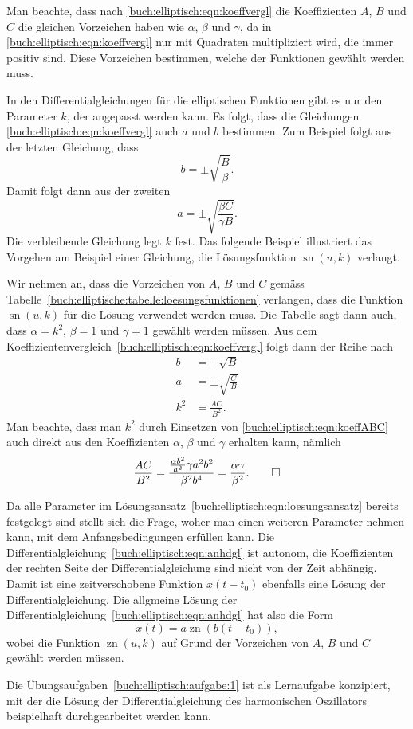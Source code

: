 Man beachte, dass nach \eqref{buch:elliptisch:eqn:koeffvergl} die 
Koeffizienten $A$, $B$ und $C$ die gleichen Vorzeichen haben wie
$\alpha$, $\beta$ und $\gamma$, da in 
\eqref{buch:elliptisch:eqn:koeffvergl} nur mit Quadraten multipliziert
wird, die immer positiv sind.
Diese Vorzeichen bestimmen, welche der Funktionen gewählt werden muss.

In den Differentialgleichungen für die elliptischen Funktionen gibt
es nur den Parameter $k$, der angepasst werden kann.
Es folgt, dass die Gleichungen
\eqref{buch:elliptisch:eqn:koeffvergl} 
auch $a$ und $b$ bestimmen.
Zum Beispiel folgt aus der letzten Gleichung, dass
\[
b = \pm\sqrt{\frac{B}{\beta}}.
\]
Damit folgt dann aus der zweiten
\[
a=\pm\sqrt{\frac{\beta C}{\gamma B}}.
\]
Die verbleibende Gleichung legt $k$ fest.
Das folgende Beispiel illustriert das Vorgehen am Beispiel einer
Gleichung, die Lösungsfunktion $\operatorname{sn}(u,k)$ verlangt.

\begin{beispiel}
Wir nehmen an, dass die Vorzeichen von $A$, $B$ und $C$ gemäss
Tabelle~\ref{buch:elliptische:tabelle:loesungsfunktionen} verlangen,
dass die Funktion $\operatorname{sn}(u,k)$ für die Lösung verwendet
werden muss.
Die Tabelle sagt dann auch, dass 
$\alpha=k^2$, $\beta=1$ und $\gamma=1$ gewählt werden müssen.
Aus dem Koeffizientenvergleich~\eqref{buch:elliptisch:eqn:koeffvergl}
folgt dann der Reihe nach
\begin{align*}
b&=\pm \sqrt{B}
\\
a&=\pm \sqrt{\frac{C}{B}}
\\
k^2
&=
\frac{AC}{B^2}.
\end{align*}
Man beachte, dass man $k^2$ durch Einsetzen von
\eqref{buch:elliptisch:eqn:koeffABC}
auch direkt aus den Koeffizienten $\alpha$, $\beta$ und $\gamma$
erhalten kann, nämlich
\[
\frac{AC}{B^2}
=
\frac{\frac{\alpha b^2}{a^2} \gamma a^2b^2}{\beta^2 b^4}
=
\frac{\alpha\gamma}{\beta^2}.
\qedhere
\]
\end{beispiel}

Da alle Parameter im 
Lösungsansatz~\eqref{buch:elliptisch:eqn:loesungsansatz} bereits
festgelegt sind stellt sich die Frage, woher man einen weiteren
Parameter nehmen kann, mit dem Anfangsbedingungen erfüllen kann.
Die Differentialgleichung~\eqref{buch:elliptisch:eqn:anhdgl} ist
autonom, die Koeffizienten der rechten Seite der Differentialgleichung
sind nicht von der Zeit abhängig. 
Damit ist eine zeitverschobene Funktion $x(t-t_0)$ ebenfalls eine
Lösung der Differentialgleichung.
Die allgmeine Lösung der 
Differentialgleichung~\eqref{buch:elliptisch:eqn:anhdgl} hat
also die Form
\[
x(t) = a\operatorname{zn}(b(t-t_0)),
\]
wobei die Funktion $\operatorname{zn}(u,k)$ auf Grund der Vorzeichen
von $A$, $B$ und $C$ gewählt werden müssen.

Die Übungsaufgaben~\ref{buch:elliptisch:aufgabe:1} ist als
Lernaufgabe konzipiert, mit der die Lösung der Differentialgleichung
des harmonischen Oszillators beispielhaft durchgearbeitet
werden kann.
